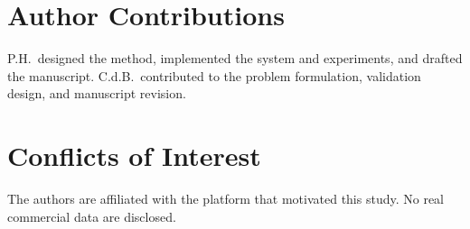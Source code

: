 \documentclass[11pt]{article}
\begin{document}
\section*{Author Contributions}
P.H.\ designed the method, implemented the system and experiments, and drafted
the manuscript. C.d.B.\ contributed to the problem formulation, validation
design, and manuscript revision.

\section*{Conflicts of Interest}
The authors are affiliated with the platform that motivated this study. No real
commercial data are disclosed.



\end{document}
